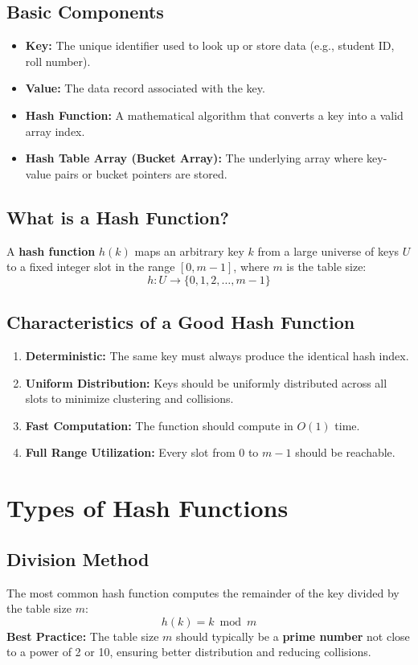 \subsection{Basic Components}
\begin{itemize}
    \item \textbf{Key:} The unique identifier used to look up or store data (e.g., student ID, roll number).
    \item \textbf{Value:} The data record associated with the key.
    \item \textbf{Hash Function:} A mathematical algorithm that converts a key into a valid array index.
    \item \textbf{Hash Table Array (Bucket Array):} The underlying array where key-value pairs or bucket pointers are stored.
\end{itemize}

\subsection{What is a Hash Function?}
A \textbf{hash function} $h(k)$ maps an arbitrary key $k$ from a large universe of keys $U$ to a fixed integer slot in the range $[0, m-1]$, where $m$ is the table size:
\[
h : U \longrightarrow \{0, 1, 2, \dots, m-1\}
\]

\subsection{Characteristics of a Good Hash Function}
\begin{enumerate}
    \item \textbf{Deterministic:} The same key must always produce the identical hash index.
    \item \textbf{Uniform Distribution:} Keys should be uniformly distributed across all slots to minimize clustering and collisions.
    \item \textbf{Fast Computation:} The function should compute in $O(1)$ time.
    \item \textbf{Full Range Utilization:} Every slot from $0$ to $m-1$ should be reachable.
\end{enumerate}

\section{Types of Hash Functions}

\subsection{Division Method}
The most common hash function computes the remainder of the key divided by the table size $m$:
\[
\boxed{h(k) = k \bmod m}
\]
\textbf{Best Practice:} The table size $m$ should typically be a \textbf{prime number} not close to a power of 2 or 10, ensuring better distribution and reducing collisions.

